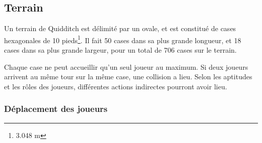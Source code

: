 \subsection{Terrain}
Un terrain de Quidditch est délimité par un ovale, et est constitué de cases hexagonales de 10 pieds\footnote{3.048 m}. Il fait 50 cases dans sa plus grande longueur, et 18 cases dans sa plus grande largeur, pour un total de 706 cases sur le terrain.

Chaque case ne peut accueillir qu'un seul joueur au maximum. Si deux joueurs arrivent au même tour sur la même case, une collision a lieu. Selon les \gls{aptitude}s et les rôles des joueurs, différentes actions indirectes pourront avoir lieu.

\subsubsection{Déplacement des joueurs}
